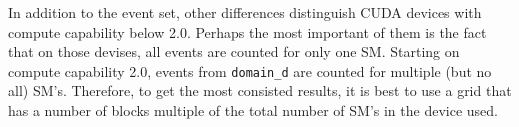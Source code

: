In addition to the event set, other differences distinguish CUDA devices with compute capability below 2.0. Perhaps the most important of them is the fact that on those devises, all events are counted for only one SM. Starting on compute capability 2.0, events from \texttt{domain\_d} are counted for multiple (but no all) SM's. Therefore, to get the most consisted results, it is best to use a grid that has a number of blocks multiple of the total number of SM's in the device used.